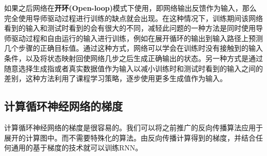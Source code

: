 \documentclass{ctexart}
\begin{document}
            如果之后网络在\textbf{开环(Open-loop)}模式下使用，即网络输出反馈作为输入，那么完全使用导师驱动过程进行训练的缺点就会出现。在这种情况下，训练期间该网络看到的输入和测试时看到的会有很大的不同，减轻此问题的一种方法是同时使用导师驱动过程和自由运行的输入进行训练，例如在展开循环的输出到输入路径上预测几个步骤的正确目标值。通过这种方式，网络可以学会在训练时没有接触到的输入条件，以及将状态映射回使网络几步之后生成正确输出的状态。另一种方式是通过随意选择生成指或者真实数据值作为输入以减小训练时和测试时看到的输入之间的差别，这种方法利用了课程学习策略，逐步使用更多生成值作为输入。

        \subsection{计算循环神经网络的梯度}
            计算循环神经网络的梯度是很容易的。我们可以将之前推广的反向传播算法应用于展开的计算图中。而不需要特殊化的算法。由反向传播计算得到的梯度，并结合任何通用的基于梯度的技术就可以训练RNN。
\end{document}
